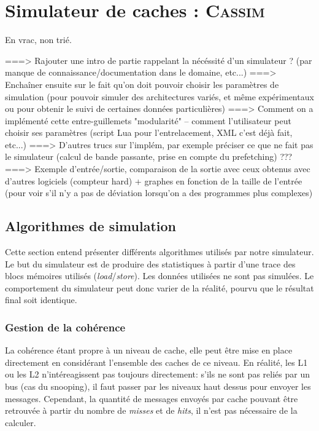 \chapter{Simulateur de caches : \textsc{Cassim}}

En vrac, non trié.

===> Rajouter une intro de partie rappelant la nécéssité d'un simulateur ? (par manque de connaissance/documentation dans le domaine, etc...)
===> Enchaîner ensuite sur le fait qu'on doit pouvoir choisir les paramètres de simulation (pour pouvoir simuler des architectures variés, et même expérimentaux ou pour obtenir le suivi de certaines données particulières)
===> Comment on a implémenté cette entre-guillemets "modularité" -- comment l'utilisateur peut choisir ses paramètres (script Lua pour l'entrelacement, XML c'est déjà fait, etc...)
===> D'autres trucs sur l'implém, par exemple préciser ce que ne fait pas le simulateur (calcul de bande passante, prise en compte du prefetching) ???
===> Exemple d'entrée/sortie, comparaison de la sortie avec ceux obtenus avec d'autres logiciels (compteur hard) + graphes en fonction de la taille de l'entrée (pour voir s'il n'y a pas de déviation lorsqu'on a des programmes plus complexes)

\section{Algorithmes de simulation}
Cette section entend présenter différents algorithmes utilisés par notre simulateur. Le but du simulateur est de produire des statistiques à partir d'une trace des blocs mémoires utilisés (\textit{load}/\textit{store}). Les données utilisées ne sont pas simulées. Le comportement du simulateur peut donc varier de la réalité, pourvu que le résultat final soit identique.

\subsection{Gestion de la cohérence}
La cohérence étant propre à un niveau de cache, elle peut être mise en place directement en considérant l'ensemble des caches de ce niveau. En réalité, les L1 ou les L2 n'intéreagissent pas toujours directement: s'ils ne sont pas reliés par un bus (cas du snooping), il faut passer par les niveaux haut dessus pour envoyer les messages. Cependant, la quantité de messages envoyés par cache pouvant être retrouvée à partir du nombre de \textit{misses} et de \textit{hits}, il n'est pas nécessaire de la calculer. \\

